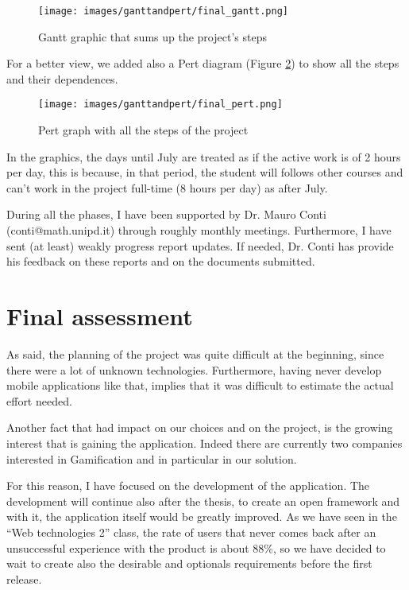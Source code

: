 \begin{figure}[H]
\centering %
\texttt{[image: images/ganttandpert/final\_gantt.png]}
\caption{Gantt graphic that sums up the project's steps}
\label{fig:gantt}
\end{figure}

For a better view, we added also a Pert diagram (Figure \ref{fig:pert}) to show all the steps and their dependences.

\begin{figure}[H]
\centering %
\texttt{[image: images/ganttandpert/final\_pert.png]}
\caption{Pert graph with all the steps of the project}
\label{fig:pert}
\end{figure}

In the graphics, the days until July are treated as if the active work is of 2 hours per day, this is because, in that period, the student will follows other courses and can't work in the project full-time (8 hours per day) as after July.

During all the phases, I have been supported by Dr. Mauro Conti \\(conti@math.unipd.it) through roughly monthly meetings. Furthermore, I have sent (at least) weakly progress report updates. If needed, Dr. Conti has provide his feedback on these reports and on the documents submitted.

\newpage
\thispagestyle{empty}
\mbox{}
\newpage

\section{Final assessment}
\label{sec:finalAssessment}

As said, the planning of the project was quite difficult at the beginning, since there were a lot of unknown technologies. Furthermore, having never develop mobile applications like that, implies that it was difficult to estimate the actual effort needed.

Another fact that had impact on our choices and on the project, is the growing interest that is gaining the application. Indeed there are currently two companies interested in Gamification and in particular in our solution.

For this reason, I have focused on the development of the application. The development will continue also after the thesis, to create an open framework and with it, the application itself would be greatly improved. As we have seen in the ``Web technologies 2'' class, the rate of users that never comes back after an unsuccessful experience with the product is about 88\%, so we have decided to wait to create also the desirable and optionals requirements before the first release.

